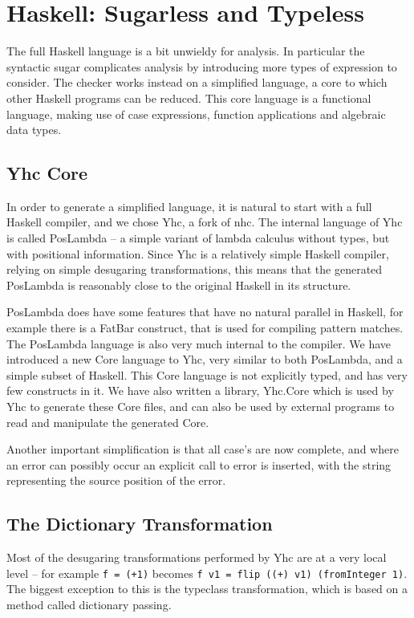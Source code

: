 \documentclass[preprint]{sigplanconf}
\newcommand{\T}[1]{\texttt{#1}}
\begin{document}
\section{Haskell: Sugarless and Typeless}
\label{chap:yhc}

The full Haskell language is a bit unwieldy for analysis. In particular the
syntactic sugar complicates analysis by introducing more types of expression to
consider. The checker works instead on a simplified language, a core to which
other Haskell programs can be reduced. This core language is a functional
language, making use of case expressions, function applications and algebraic
data types.

\subsection{Yhc Core}

In order to generate a simplified language, it is natural to start with a full
Haskell compiler, and we chose Yhc, a fork of nhc. The internal language of Yhc
is called PosLambda -- a simple variant of lambda calculus without types, but
with positional information. Since Yhc is a relatively simple Haskell compiler,
relying on simple desugaring transformations, this means that the generated
PosLambda is reasonably close to the original Haskell in its structure.

PosLambda does have some features that have no natural parallel in Haskell, for
example there is a FatBar construct, that is used for compiling pattern
matches. The PosLambda language is also very much internal to the compiler. We
have introduced a new Core language to Yhc, very similar to both PosLambda, and
a simple subset of Haskell. This Core language is not explicitly typed, and has
very few constructs in it. We have also written a library, Yhc.Core which is
used by Yhc to generate these Core files, and can also be used by external
programs to read and manipulate the generated Core.

Another important simplification is that all case's are now complete, and where
an error can possibly occur an explicit call to error is inserted, with the
string representing the source position of the error.

\subsection{The Dictionary Transformation}

Most of the desugaring transformations performed by Yhc are at a very local
level -- for example \T{f = (+1)} becomes \T{f v1 = flip ((+) v1) (fromInteger
1)}. The biggest exception to this is the typeclass transformation, which is
based on a method called dictionary passing.
\end{document}

